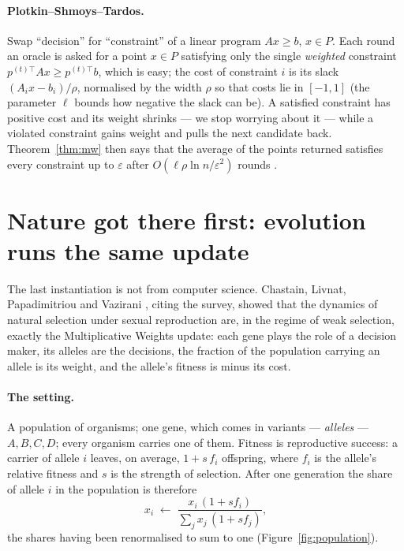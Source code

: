 \documentclass[11pt,a4paper]{article}
\theoremstyle{plain}
\theoremstyle{definition}
\begin{document}
\paragraph{Plotkin--Shmoys--Tardos.}
Swap ``decision'' for ``constraint'' of a linear program $Ax \ge b$, $x \in P$. Each round an oracle is asked for a point $x \in P$ satisfying only the single \emph{weighted} constraint $p^{(t)\top}Ax \ge p^{(t)\top}b$, which is easy; the cost of constraint $i$ is its slack $(A_ix - b_i)/\rho$, normalised by the width $\rho$ so that costs lie in $[-1,1]$ (the parameter $\ell$ bounds how negative the slack can be). A satisfied constraint has positive cost and its weight shrinks --- we stop worrying about it --- while a violated constraint gains weight and pulls the next candidate back. Theorem~\ref{thm:mw} then says that the average of the points returned satisfies every constraint up to $\varepsilon$ after $O(\ell\rho\ln n/\varepsilon^2)$ rounds \cite[Section~3.3]{AHK12}.

\clearpage
\section{Nature got there first: evolution runs the same update}
\label{sec:nature}

The last instantiation is not from computer science. Chastain, Livnat, Papadimitriou and Vazirani \cite{CLPV14}, citing the survey, showed that the dynamics of natural selection under sexual reproduction are, in the regime of weak selection, exactly the Multiplicative Weights update: each gene plays the role of a decision maker, its alleles are the decisions, the fraction of the population carrying an allele is its weight, and the allele's fitness is minus its cost.

\paragraph{The setting.}
A population of organisms; one gene, which comes in variants --- \emph{alleles} --- $A,B,C,D$; every organism carries one of them. Fitness is reproductive success: a carrier of allele $i$ leaves, on average, $1 + s\,f_i$ offspring, where $f_i$ is the allele's relative fitness and $s$ is the strength of selection. After one generation the share of allele $i$ in the population is therefore
\begin{equation}
\label{eq:selection}
x_i \;\longleftarrow\; \frac{x_i\,(1 + s f_i)}{\sum_j x_j\,(1 + s f_j)} ,
\end{equation}
the shares having been renormalised to sum to one (Figure~\ref{fig:population}).
\end{document}
